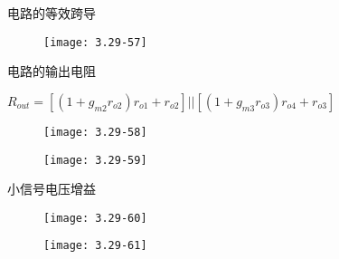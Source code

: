 电路的等效跨导

		\begin{figure}[H] %
	\begin{minipage}{\linewidth}
		\texttt{[image: 3.29-57]}
	\end{minipage}
\end{figure}


电路的输出电阻

$R_{out}=[(1+g_{m2}r_{o2})r_{o1}+r_{o2}]||[(1+g_{m3}r_{o3})r_{o4}+r_{o3}]$

		\begin{figure}[H] %
	\begin{minipage}{\linewidth}
		\texttt{[image: 3.29-58]}
	\end{minipage}
\end{figure}

		\begin{figure}[H] %
	\begin{minipage}{\linewidth}
		\texttt{[image: 3.29-59]}
	\end{minipage}
\end{figure}

小信号电压增益

		\begin{figure}[H] %
	\begin{minipage}{\linewidth}
		\texttt{[image: 3.29-60]}
	\end{minipage}
\end{figure}

		\begin{figure}[H] %
	\begin{minipage}{\linewidth}
		\texttt{[image: 3.29-61]}
	\end{minipage}
\end{figure}




